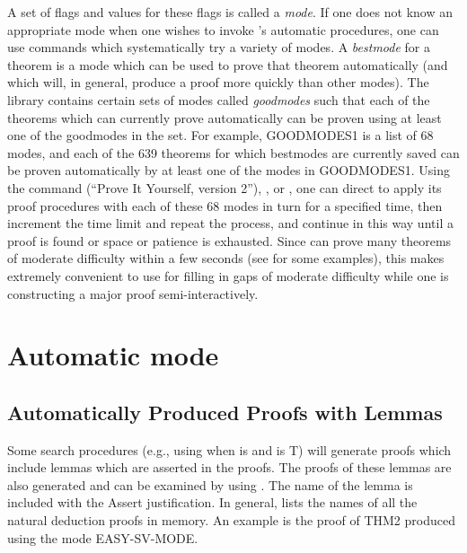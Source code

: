 A set of flags and values for these flags is called a {\it
mode}. 
If one does not know an appropriate
mode when one wishes to invoke {\TPS}'s automatic procedures, one can
use commands which systematically try a variety of modes.  A {\it
bestmode} for a theorem is a mode which can be used to prove that
theorem automatically (and which will, in general, produce a proof
more quickly than other modes).  The {\TPS} library contains certain sets of
modes called {\it goodmodes} such that each of the theorems which
{\TPS} can currently prove automatically can be proven using at least
one of the goodmodes in the set.  For example, GOODMODES1 is a list of
68 modes, and each of the 639 theorems for which
bestmodes are currently saved can be proven automatically by at least
one of the modes in GOODMODES1.  Using the command 
(``Prove It Yourself, version 2''), , or 
, one can direct {\TPS} to 
apply its proof procedures with each of these 68 modes in turn for a specified
time, then increment the time limit and repeat the process, and
continue in this way until a proof is found or space or patience is
exhausted.  Since {\TPS} can prove many theorems of moderate
difficulty within a few seconds (see 
\cite{Bishop98,Bishop99,Bishop99a,Andrews00a,Brown2002,Brown2004a} for some
examples), this makes {\TPS} extremely
convenient to use for filling in gaps of moderate difficulty while one
is constructing a major proof semi-interactively.


\section{Automatic mode}




\subsection{Automatically Produced Proofs with Lemmas}

Some search procedures (e.g., using  when  is  and  is T)
will generate proofs which include lemmas which are asserted in the proofs.  The proofs of these lemmas are also generated
and can be examined by using .  The name of the lemma is included with the
Assert justification.  In general,  lists the names of all the natural deduction proofs
in memory.  An example is the proof of THM2 produced using the mode EASY-SV-MODE.


